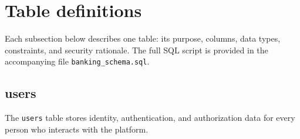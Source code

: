 \section{Table definitions}

Each subsection below describes one table: its purpose, columns, data types, constraints, and security rationale. The full SQL script is provided in the accompanying file \texttt{banking\_schema.sql}.

\subsection{users}
\label{sec:tbl-users}

The \texttt{users} table stores identity, authentication, and authorization data for every person who interacts with the platform.

